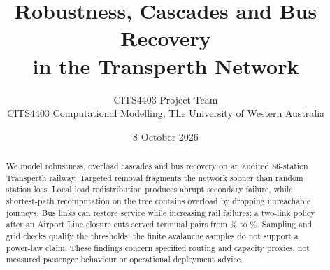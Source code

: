 \documentclass[11pt,a4paper]{article}
\title{Robustness, Cascades and Bus Recovery\\in the Transperth Network}
\author{CITS4403 Project Team\\[2pt]
        \small CITS4403 Computational Modelling, The University of Western Australia}
\date{8 October 2026}
\begin{document}
\maketitle
\thispagestyle{empty}

\begin{abstract}
\normalsize
\noindent
We model robustness, overload cascades and bus recovery on an audited
86-station Transperth railway. Targeted removal fragments the network sooner
than random station loss. Local load redistribution produces abrupt secondary
failure, while shortest-path recomputation on the tree contains overload
by dropping unreachable journeys. Bus links can restore service while increasing
rail failures; a two-link policy after an Airport Line closure cuts served
terminal pairs from \AirportRailServicePercent\% to
\AirportBusServicePercent\%. Sampling and grid checks qualify the thresholds;
the finite avalanche samples do not support a power-law claim.
These findings concern specified routing and capacity proxies, not measured
passenger behaviour or operational deployment advice.
\end{abstract}







\clearpage

\clearpage




\appendix
\clearpage

\end{document}
